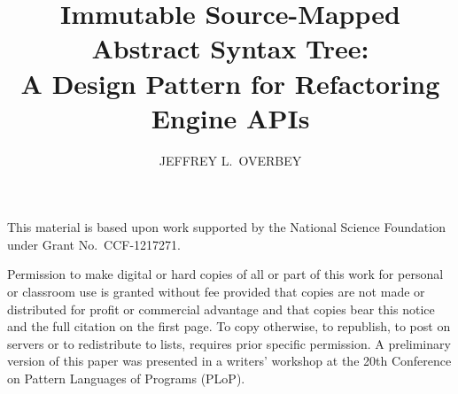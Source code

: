 \documentclass[prodmode]{acmlarge}
\title{Immutable Source-Mapped Abstract Syntax Tree: \\
A Design Pattern for Refactoring Engine APIs}
\author{JEFFREY L.\ OVERBEY \affil{Auburn University}}
\begin{document}
\begin{bottomstuff}
This material is based upon work supported by the National Science Foundation
under Grant No.~CCF-1217271.

Permission to make digital or hard copies of all or part of this work for
personal or classroom use is granted without fee provided that copies are not
made or distributed for profit or commercial advantage and that copies bear
this notice and the full citation on the first page. To copy otherwise, to
republish, to post on servers or to redistribute to lists, requires prior
specific permission. A preliminary version of this paper was presented in a
writers' workshop at the 20th Conference on Pattern Languages of Programs
(PLoP).
\end{bottomstuff}


\maketitle
\end{document}
